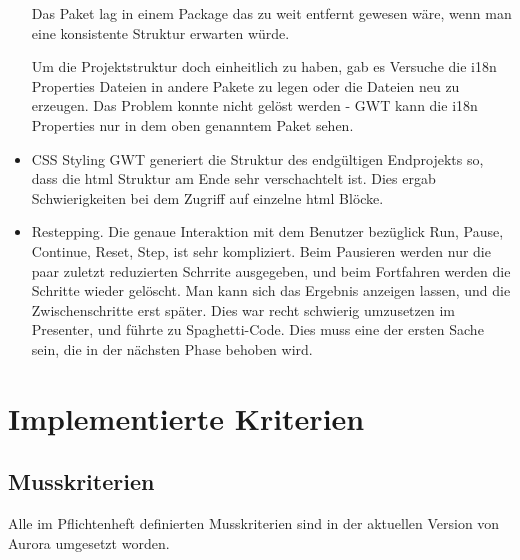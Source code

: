\documentclass[parskip=full,11pt,twoside]{scrartcl}
\begin{document}
\begin{itemize}
Das Paket lag in einem Package das zu weit entfernt gewesen wäre, wenn man eine konsistente Struktur erwarten würde.


Um die Projektstruktur doch einheitlich zu haben, gab es Versuche die i18n Properties Dateien in andere Pakete zu legen oder die Dateien neu zu erzeugen. Das Problem konnte nicht gelöst werden - GWT kann die i18n Properties nur in dem oben genanntem Paket sehen.

	\item CSS Styling
    	\newline
	GWT generiert die Struktur des endgültigen Endprojekts so, dass die html Struktur am Ende sehr verschachtelt ist. Dies ergab Schwierigkeiten bei dem Zugriff auf einzelne html Blöcke.

    \item Restepping.
    \newline
    Die genaue Interaktion mit dem Benutzer bezüglick Run, Pause, Continue, Reset, Step, ist sehr kompliziert. Beim Pausieren werden nur die paar zuletzt reduzierten Schrrite ausgegeben, und beim Fortfahren werden die Schritte wieder gelöscht.
    \newline
    Man kann sich das Ergebnis anzeigen lassen, und die Zwischenschritte erst später. Dies war recht schwierig umzusetzen im Presenter, und führte zu Spaghetti-Code. Dies muss eine der ersten Sache sein, die in der nächsten Phase behoben wird.

\end{itemize}

\newpage


\section{Implementierte Kriterien}

\subsection{Musskriterien}
Alle im Pflichtenheft definierten Musskriterien sind in der aktuellen Version von Aurora umgesetzt worden.
\end{document}
